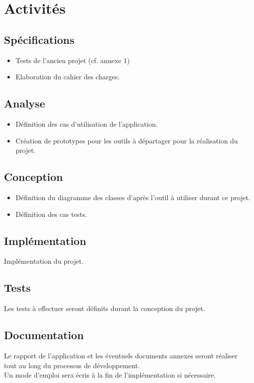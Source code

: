 \documentclass{article}
\begin{document}
\section{Activités}
  \subsection{Spécifications}
    \begin{itemize}
      \item Tests de l'ancien projet (cf. annexe 1)
      \item Elaboration du cahier des charges.
    \end{itemize}
  \subsection{Analyse}
    \begin{itemize}
      \item Définition des cas d'utilisation de l'application.
      \item Création de prototypes pour les outils à départager pour la réalisation du projet.
    \end{itemize}
  \subsection{Conception}
    \begin{itemize}
      \item Définition du diagramme des classes d'après l'outil à utiliser durant ce projet.
      \item Définition des cas tests.
    \end{itemize}
  \subsection{Implémentation}
  Implémentation du projet.
  \subsection{Tests}
  Les tests à effectuer seront définits durant la conception du projet.
  \subsection{Documentation}
  Le rapport de l'application et les éventuels documents annexes seront réaliser
  tout au long du processus de développement.\\
  Un mode d'emploi sera écris à la fin de l'implémentation si nécessaire.
\end{document}
